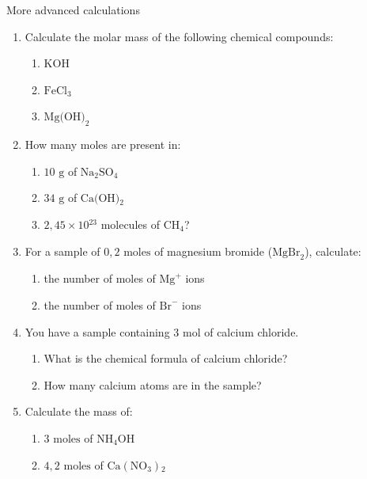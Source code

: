            \begin{exercises}{  More advanced calculations }
            \nopagebreak \noindent
      \label{m38717*id279756}\begin{enumerate}[noitemsep, label=\textbf{\arabic*}. ] 
            \label{m38717*uid47}\item Calculate the molar mass of the following chemical compounds:
\label{m38717*id279772}\begin{enumerate}[noitemsep, label=\textbf{\alph*}. ] 
            \label{m38717*uid48}\item $\text{KOH}$
\label{m38717*uid49}\item $\text{FeCl}{}_{3}$
\label{m38717*uid50}\item ${\text{Mg(OH)}}_{2}$
\end{enumerate}
                \label{m38717*uid51}\item How many moles are present in:
\label{m38717*id279848}\begin{enumerate}[noitemsep, label=\textbf{\alph*}. ] 
            \label{m38717*uid52}\item $10 \text{ g}$ of $\text{Na}_{2}\text{SO}{}_{4}$
\label{m38717*uid53}\item $34 \text{ g}$ of $\text{Ca(OH)}{}_{2}$
\label{m38717*uid54}\item $2,45 \times 10{}^{23}$ molecules of $\text{CH}{}_{4}$?
\end{enumerate}
                \label{m38717*uid55}\item For a sample of $0,2 \text{ moles}$ of magnesium bromide ($\text{MgBr}_{2}$), calculate:
\label{m38717*id279964}\begin{enumerate}[noitemsep, label=\textbf{\alph*}. ] 
            \label{m38717*uid56}\item the number of moles of ${\text{Mg}}^{+}$ ions
\label{m38717*uid57}\item the number of moles of ${\text{Br}}^{-}$ ions
\end{enumerate}
                \label{m38717*uid58}\item You have a sample containing $3 \text{ mol}$ of calcium chloride.
\label{m38717*id280031}\begin{enumerate}[noitemsep, label=\textbf{\alph*}. ] 
            \label{m38717*uid59}\item What is the chemical formula of calcium chloride?
\label{m38717*uid60}\item How many calcium atoms are in the sample?
\end{enumerate}
               \label{m38717*uid61}\item Calculate the mass of:
\label{m38717*id280072}\begin{enumerate}[noitemsep, label=\textbf{\alph*}. ] 
            \label{m38717*uid62}\item $3\text{ moles}$ of $\text{NH}{}_{4}\text{OH}$
\label{m38717*uid63}\item $4,2 \text{ moles}$ of $\text{Ca}\left(\text{NO}{}_{3}\right){}_{2}$\end{enumerate}


\end{enumerate}
\end{exercises}
